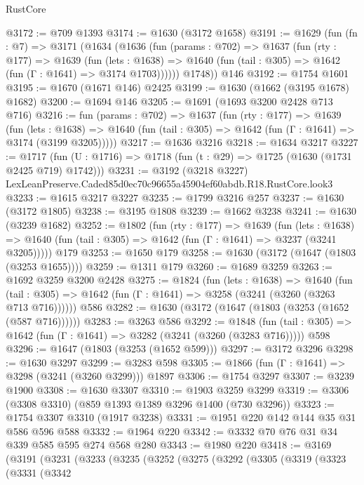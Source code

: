 \begin{lexlean}{RustCore}
\begin{coremodule}
@3172 := @709 @1393
@3174 := @1630 (@3172 @1658)
@3191 := @1629
    (fun (fn : @7) =>
    @3171
      (@1634
        (@1636
          (fun (params : @702) =>
          @1637
            (fun (rty : @177) =>
            @1639
              (fun (lets : @1638) =>
              @1640 (fun (tail : @305) => @1642 (fun (Γ : @1641) => @3174 @1703))))))
        @1748))
    @146
@3192 := @1754 @1601
@3195 := @1670 (@1671 @146) @2425
@3199 := @1630 (@1662 (@3195 @1678) @1682)
@3200 := @1694 @146
@3205 := @1691 (@1693 @3200 @2428 @713 @716)
@3216 := fun (params : @702) =>
  @1637
    (fun (rty : @177) =>
    @1639
      (fun (lets : @1638) =>
      @1640 (fun (tail : @305) => @1642 (fun (Γ : @1641) => @3174 (@3199 @3205)))))
@3217 := @1636 @3216
@3218 := @1634 @3217
@3227 := @1717 (fun (U : @1716) => @1718 (fun (t : @29) => @1725 (@1630 (@1731 @2425 @719) @1742)))
@3231 := @3192 (@3218 @3227) LexLeanPreserve.Caded85d0ec70c96655a45904ef60abdb.R18.RustCore.look3
@3233 := @1615 @3217 @3227
@3235 := @1799 @3216 @257
@3237 := @1630 (@3172 @1805)
@3238 := @3195 @1808
@3239 := @1662 @3238
@3241 := @1630 (@3239 @1682)
@3252 := @1802
    (fun (rty : @177) =>
    @1639
      (fun (lets : @1638) =>
      @1640 (fun (tail : @305) => @1642 (fun (Γ : @1641) => @3237 (@3241 @3205)))))
    @179
@3253 := @1650 @179
@3258 := @1630 (@3172 (@1647 (@1803 (@3253 @1655))))
@3259 := @1311 @179
@3260 := @1689 @3259
@3263 := @1692 @3259 @3200 @2428
@3275 := @1824
    (fun (lets : @1638) =>
    @1640 (fun (tail : @305) => @1642 (fun (Γ : @1641) => @3258 (@3241 (@3260 (@3263 @713 @716))))))
    @586
@3282 := @1630 (@3172 (@1647 (@1803 (@3253 (@1652 (@587 @716))))))
@3283 := @3263 @586
@3292 := @1848
    (fun (tail : @305) => @1642 (fun (Γ : @1641) => @3282 (@3241 (@3260 (@3283 @716)))))
    @598
@3296 := @1647 (@1803 (@3253 (@1652 @599)))
@3297 := @3172 @3296
@3298 := @1630 @3297
@3299 := @3283 @598
@3305 := @1866 (fun (Γ : @1641) => @3298 (@3241 (@3260 @3299))) @1897
@3306 := @1754 @3297
@3307 := @3239 @1900
@3308 := @1630 @3307
@3310 := @1903 @3259 @3299
@3319 := @3306 (@3308 @3310) (@859 @1393 @1389 @3296 @1400 (@730 @3296))
@3323 := @1754 @3307 @3310 (@1917 @3238)
@3331 := @1951 @220 @142 @144 @35 @31 @586 @596 @588
@3332 := @1964 @220
@3342 := @3332 @70 @76 @31 @34 @339 @585 @595 @274 @568 @280
@3343 := @1980 @220
@3418 := @3169
    (@3191
      (@3231
        (@3233
          (@3235
            (@3252
              (@3275
                (@3292
                  (@3305
                    (@3319
                      (@3323
                        (@3331
                          (@3342

\end{coremodule}
\end{lexlean}
